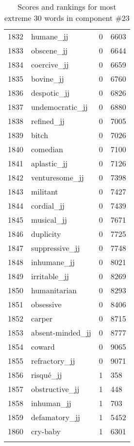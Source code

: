 \begin{longtable}[!htbp]{| rlr@{.}l |}
    1832 & humane\_jj & 0 & 6603 \\
    1833 & obscene\_jj & 0 & 6644 \\
    1834 & coercive\_jj & 0 & 6659 \\
    1835 & bovine\_jj & 0 & 6760 \\
    1836 & despotic\_jj & 0 & 6826 \\
    1837 & undemocratic\_jj & 0 & 6880 \\
    1838 & refined\_jj & 0 & 7005 \\
    1839 & bitch & 0 & 7026 \\
    1840 & comedian & 0 & 7100 \\
    1841 & aplastic\_jj & 0 & 7126 \\
    1842 & venturesome\_jj & 0 & 7398 \\
    1843 & militant & 0 & 7427 \\
    1844 & cordial\_jj & 0 & 7439 \\
    1845 & musical\_jj & 0 & 7671 \\
    1846 & duplicity & 0 & 7725 \\
    1847 & suppressive\_jj & 0 & 7748 \\
    1848 & inhumane\_jj & 0 & 8021 \\
    1849 & irritable\_jj & 0 & 8269 \\
    1850 & humanitarian & 0 & 8293 \\
    1851 & obsessive & 0 & 8406 \\
    1852 & carper & 0 & 8715 \\
    1853 & absent-minded\_jj & 0 & 8777 \\
    1854 & coward & 0 & 9065 \\
    1855 & refractory\_jj & 0 & 9071 \\
    1856 & risqué\_jj & 1 & 358 \\
    1857 & obstructive\_jj & 1 & 448 \\
    1858 & inhuman\_jj & 1 & 703 \\
    1859 & defamatory\_jj & 1 & 5452 \\
    1860 & cry-baby & 1 & 6301 \\
    \hline
    \caption{Scores and rankings for most extreme 30 words in component \#23} \\
\end{longtable}
